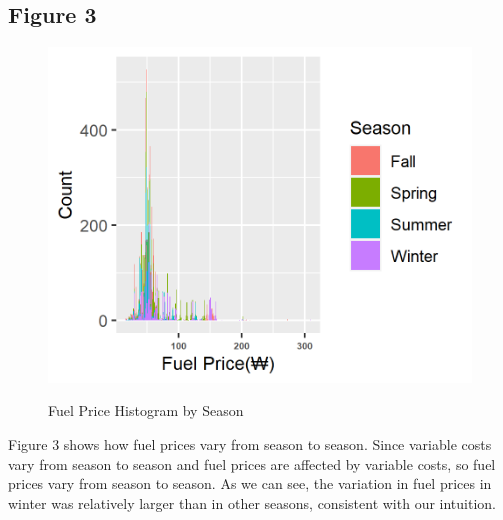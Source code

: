 \documentclass{article}
\begin{document}
\subsection{Figure 3}

\begin{figure}[t]
    \centering
            \caption{Fuel Price Histogram by Season}
        \includegraphics[width=0.5\linewidth]{Figure3.png}
        \label{fig:88mono}
\end{figure}

\large{Figure 3 shows how fuel prices vary from season to season. Since variable costs vary from season to season and fuel prices are affected by variable costs, so fuel prices vary from season to season. 
As we can see, the variation in fuel prices in winter was relatively larger than in other seasons, consistent with our intuition.}
\\
\end{document}
